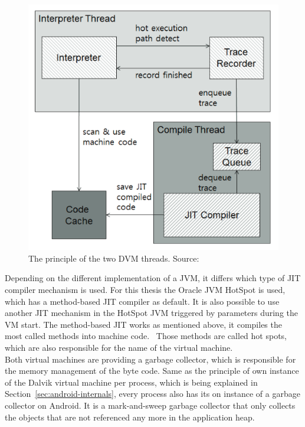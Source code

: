 \begin{figure}[h]
\begin{center}
\includegraphics[scale=0.5]{images/dvm-threads.png} 
\caption{The principle of the two DVM threads. Source:\cite{oh2012evaluation}}
\label{fig:dvm-threads}
\end{center}
\end{figure}
\newpage
Depending on the different implementation of a JVM, it differs which type of JIT compiler mechanism is used.
For this thesis the Oracle JVM HotSpot is used, which has a method-based JIT compiler as default.
It is also possible to use another JIT mechanism in the HotSpot JVM triggered by parameters during the VM start.
The method-based JIT works as mentioned above, it compiles the most called methods into machine code.~\cite{kotzmann2008design}
Those methods are called hot spots, which are also responsible for the name of the virtual machine.~\cite{paleczny2001java}
\\
Both virtual machines are providing a garbage collector, which is responsible for the memory management of the byte code.
Same as the principle of own instance of the Dalvik virtual machine per process, which is being explained in Section~\ref{sec:android-internals}, every process also has its on instance of a garbage collector on Android.
It is a mark-and-sweep garbage collector that only collects the objects that are not referenced any more in the application heap.
